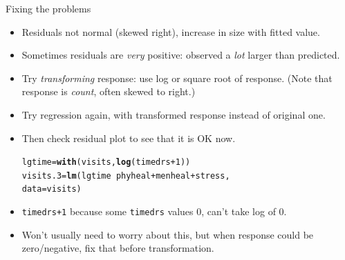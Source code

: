\documentclass[unknownkeysallowed]{beamer}\usepackage[]{graphicx}\usepackage[]{color}
\makeatletter
\newcommand{\hlnum}[1]{\textcolor[rgb]{0.686,0.059,0.569}{#1}}%
\newcommand{\hlopt}[1]{\textcolor[rgb]{0,0,0}{#1}}%
\newcommand{\hlstd}[1]{\textcolor[rgb]{0.345,0.345,0.345}{#1}}%
\newcommand{\hlkwb}[1]{\textcolor[rgb]{0.69,0.353,0.396}{#1}}%
\newcommand{\hlkwc}[1]{\textcolor[rgb]{0.333,0.667,0.333}{#1}}%
\newcommand{\hlkwd}[1]{\textcolor[rgb]{0.737,0.353,0.396}{\textbf{#1}}}%
\newenvironment{kframe}{%
 \def\at@end@of@kframe{}%
 \ifinner\ifhmode%
  \def\at@end@of@kframe{\end{minipage}}%
  \begin{minipage}{\columnwidth}%
 \fi\fi%
 \def\FrameCommand##1{\hskip\@totalleftmargin \hskip-\fboxsep
 \colorbox{shadecolor}{##1}\hskip-\fboxsep
     \hskip-\linewidth \hskip-\@totalleftmargin \hskip\columnwidth}%
 \MakeFramed {\advance\hsize-\width
   \@totalleftmargin\z@ \linewidth\hsize
   \@setminipage}}%
 {\par\unskip\endMakeFramed%
 \at@end@of@kframe}
\newenvironment{knitrout}{}{} %
\makeatother
\begin{document}
\begin{frame}[fragile]{Fixing the problems}

  \begin{itemize}
  \item Residuals not normal (skewed right), increase in size with
    fitted value.
  \item Sometimes residuals are {\em very} positive: observed a {\em lot} larger than predicted.
  \item Try {\em  transforming} response: use log or square root of response. (Note that response is {\em count}, often skewed to right.)
  \item Try regression again, with transformed response instead of
    original one.
  \item Then check residual plot to see that it is OK now.

 
\begin{knitrout}
\color{fgcolor}\begin{kframe}
\begin{alltt}
\hlstd{lgtime}\hlkwb{=}\hlkwd{with}\hlstd{(visits,}\hlkwd{log}\hlstd{(timedrs}\hlopt{+}\hlnum{1}\hlstd{))}
\hlstd{visits.3}\hlkwb{=}\hlkwd{lm}\hlstd{(lgtime}\hlopt{~}\hlstd{phyheal}\hlopt{+}\hlstd{menheal}\hlopt{+}\hlstd{stress,}
  \hlkwc{data}\hlstd{=visits)}
\end{alltt}
\end{kframe}
\end{knitrout}
    
\item \texttt{timedrs+1}  because some \texttt{timedrs} values 0,
  can't take log of 0.
\item Won't usually need to worry about this, but when response could
  be zero/negative, fix that before transformation.
  \end{itemize}
  
\end{frame}
\end{document}
